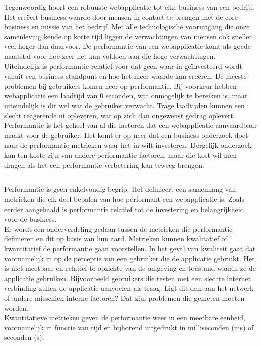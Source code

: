 Tegenwoordig hoort een robuuste webapplicatie tot elke business van een bedrijf. Het creëert business-waarde door mensen in contact te brengen met de core-business en missie van het bedrijf. Met alle technologische vooruitgang die onze samenleving kende op korte tijd liggen de verwachtingen van mensen ook sneller veel hoger dan daarvoor. De performantie van een webapplicatie komt als goede maatstaf voor hoe zeer het kan voldoen aan die hoge verwachtingen. \\
Uiteindelijk is performantie relatief voor dat geen waar in geïnvesteerd wordt vanuit een business standpunt en hoe het meer waarde kan creëren. De meeste problemen bij gebruikers komen neer op performantie. Bij voorkeur hebben webapplicatie een laadtijd van 0 seconden, wat onmogelijk te bereiken is, maar uiteindelijk is dit wel wat de gebruiker verwacht. Trage laadtijden kunnen een slecht reagerende \gls{ui} opleveren, wat op zich dan ongewenst gedrag oplevert. \\ Performantie is het geheel van al die factoren dat een webapplicatie aanvaardbaar maakt voor de gebruiker. Het komt er op neer dat een business onderzoek doet naar de performantie metrieken waar het in wilt investeren. Dergelijk onderzoek kan ten koste zijn van andere performantie factoren, maar die kost wil men dragen als het een performantie verbetering kan teweeg brengen.

\subsection{}
\label{sec:beschrijvendeMetrieken}

Performantie is geen enkelvoudig begrip. Het definieert een samenhang van metrieken die elk deel bepalen van hoe performant een webapplicatie is. Zoals eerder aangehaald is performantie relatief tot de investering en belangrijkheid voor de business. \\
Er wordt een onderverdeling gedaan tussen de metrieken die performantie definiëren en dit op basis van hun aard. Metrieken kunnen kwalitatief of kwantitatief de performantie gaan voorstellen. In het geval van kwaliteit gaat dat voornamelijk in op de perceptie van een gebruiker die de applicatie gebruikt. Het is niet meetbaar en relatief te opzichte van de omgeving en toestand waarin ze de applicatie gebruiken. Bijvoorbeeld gebruikers die testen met een slechte internet verbinding zullen de applicatie aanvoelen als traag. Ligt dit dan aan het netwerk of andere misschien interne factoren? Dat zijn problemen die gemeten moeten worden. \\
Kwantitatieve metrieken geven de performantie weer in een meetbare eenheid, voornamelijk in functie van tijd en bijhorend uitgedrukt in milliseconden (ms) of seconden (s).

